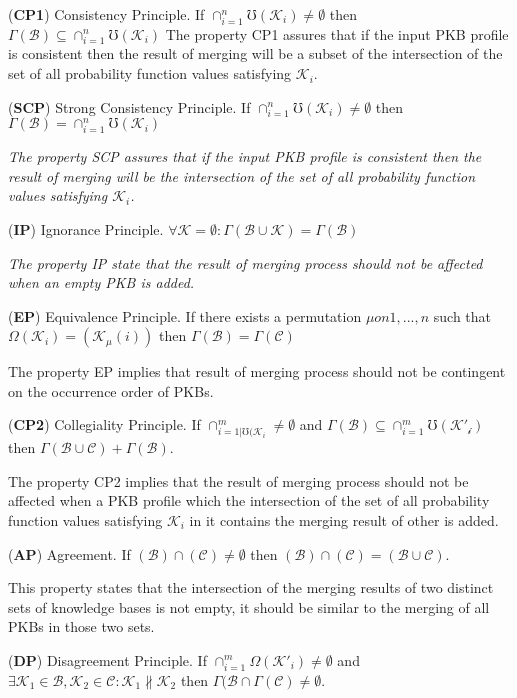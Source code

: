 \documentclass[10pt,a4paper]{IOS-Book-Article}
\begin{document}
(\textbf{CP1}) Consistency Principle. If $\cap^n_{i=1}\mho(\mathcal{K}_i) \neq \emptyset$ then $\Gamma(\mathcal{B}) \subseteq \cap^n_{i=1}\mho(\mathcal{K}_i)$
The property CP1 assures that if the input PKB profile is consistent then the result of merging will be a subset of the intersection of the set of all probability function values satisfying $\mathcal{K}_i$.

(\textbf{SCP}) Strong Consistency Principle. If $\cap^n_{i=1}\mho(\mathcal{K}_i) \neq \emptyset$ then $\Gamma(\mathcal{B}) = \cap^n_{i=1}\mho(\mathcal{K}_i)$

\textit{The property SCP assures that if the input PKB profile is consistent then the result of merging will be the intersection of the set of all probability function
values satisfying $\mathcal{K}_i$.}

(\textbf{IP}) Ignorance Principle. $\forall \mathcal{K} = \emptyset : \Gamma(\mathcal{B} \cup \mathcal{K}) = \Gamma(\mathcal{B})$

\textit{The property IP state that the result of merging process should not be affected when an empty PKB is added.}

(\textbf{EP}) Equivalence Principle. If there exists a permutation $\mu on {1, ... , n}$ such that $\Omega(\mathcal{K}_i) = (\mathcal{K}_\mu(i))$ then $\Gamma(\mathcal{B}) =  \Gamma(\mathcal{C})$

The property EP implies that result of merging process should not be contingent on the occurrence order of PKBs.

(\textbf{CP2}) Collegiality Principle. If $\cap^m_{i=1|\mho(\mathcal{K}_i} \neq \emptyset$ and $\Gamma(\mathcal{B}) \subseteq \cap^m_{i=1}\mho(\mathcal{K'_i})$ then $\Gamma(\mathcal{B} \cup \mathcal{C}) + \Gamma(\mathcal{B})$.

The property CP2 implies that the result of merging process should not be affected when a PKB profile which the intersection of the set of all probability function values satisfying $\mathcal{K}_i$ in it contains the merging result of other is added.

(\textbf{AP}) Agreement. If $(\mathcal{B}) \cap (\mathcal{C}) \neq \emptyset$ then $(\mathcal{B}) \cap (\mathcal{C}) = (\mathcal{B} \cup \mathcal{C})$.

This property states that the intersection of the merging results of two distinct sets of knowledge bases is not empty, it should be similar to the merging of all PKBs in those two sets.

(\textbf{DP}) Disagreement Principle. If $\cap^m_{i=1}\Omega(\mathcal{K}'_i) \neq \emptyset$ and $\exists \mathcal{K}_1 \in \mathcal{B}, \mathcal{K}_2 \in \mathcal{C}: \mathcal{K}_1 \nparallel \mathcal{K}_2$ then $\Gamma(\mathcal{B} \cap \Gamma(\mathcal{C}) \neq \emptyset$.
\end{document}

